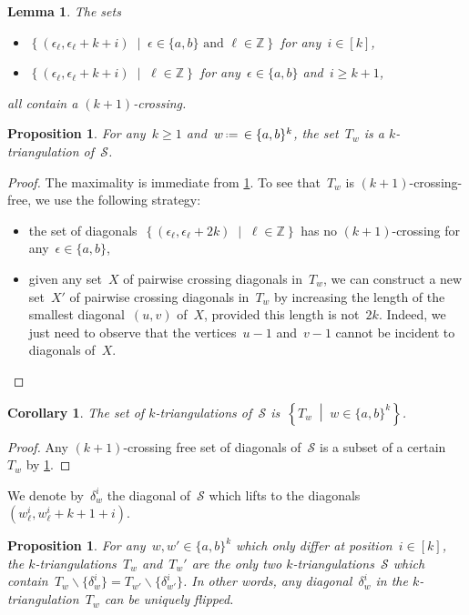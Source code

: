 \documentclass{amsart}
\newtheorem{proposition}[theorem]{Proposition}
\newtheorem{lemma}[theorem]{Lemma}
\newtheorem{corollary}[theorem]{Corollary}
\theoremstyle{remark}
\newcommand{\Z}{\mathbb{Z}} %
\newcommand{\set}[2]{\left\{ #1 \;\middle|\; #2 \right\}} %
\newcommand{\ssm}{\smallsetminus} %
\newcommand{\eqdef}{\mbox{\,\raisebox{0.2ex}{\scriptsize\ensuremath{\mathrm:}}\ensuremath{=}\,}} %
\newcommand{\surface}{\mathcal{S}}
\begin{document}
\begin{lemma}
\label{lem:noTwoDiagonalsEachLevel}
The sets
\begin{itemize}
\item $\set{(\epsilon_\ell, \epsilon_\ell+k+i)}{\epsilon \in \{a,b\} \text{ and } \ell \in \Z}$ for any~$i \in [k]$,
\item $\set{(\epsilon_\ell, \epsilon_\ell+k+i)}{\ell \in \Z}$ for any~$\epsilon \in \{a,b\}$ and~$i \ge k+1$,
\end{itemize}
all contain a $(k+1)$-crossing.
\end{lemma}

\begin{proposition}
For any~$k \ge 1$ and~$w \eqdef  \in \{a,b\}^k$, the set~$T_w$ is a $k$-triangulation of~$\surface$.
\end{proposition}

\begin{proof}
The maximality is immediate from \cref{lem:noTwoDiagonalsEachLevel}.
To see that~$T_w$ is $(k+1)$-crossing-free, we use the following strategy:
\begin{itemize}
\item the set of diagonals~$\set{(\epsilon_\ell, \epsilon_\ell+2k)}{\ell \in \Z}$ has no $(k+1)$-crossing for any~$\epsilon \in \{a,b\}$,
\item given any set~$X$ of pairwise crossing diagonals in~$T_w$, we can construct a new set~$X'$ of pairwise crossing diagonals in~$T_w$ by increasing the length of the smallest diagonal~$(u,v)$ of~$X$, provided this length is not~$2k$. Indeed, we just need to observe that the vertices~$u-1$ and~$v-1$ cannot be incident to diagonals of~$X$.
\qedhere
\end{itemize}
\end{proof}

\begin{corollary}
\label{coro:allkTriangCyclinder}
The set of $k$-triangulations of~$\surface$ is~$\set{T_w}{w \in \{a,b\}^k}$.
\end{corollary}

\begin{proof}
Any $(k+1)$-crossing free set of diagonals of~$\surface$ is a subset of a certain~$T_w$ by \cref{lem:noTwoDiagonalsEachLevel}.
\end{proof}

We denote by~$\delta_w^i$ the diagonal of~$\surface$ which lifts to the diagonals~$(w^i_\ell, w^i_{\ell}+k+1+i)$.

\begin{proposition}
For any~$w, w' \in \{a,b\}^k$ which only differ at position~$i \in [k]$, the $k$-triangulations~$T_w$ and~$T_w'$ are the only two $k$-triangulations~$\surface$ which contain~${T_w \ssm \{\delta_w^i\} = T_{w'} \ssm \{\delta_{w'}^i\}}$. In other words, any diagonal~$\delta_w^i$ in the $k$-triangulation~$T_w$ can be uniquely flipped.
\end{proposition}
\end{document}

